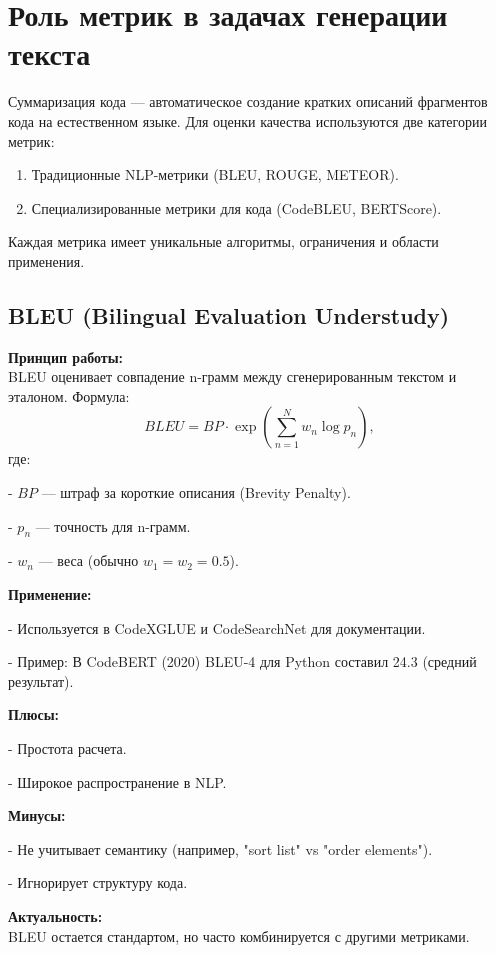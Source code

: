 \documentclass[14pt]{article}
\theoremstyle{definition}
\begin{document}
\newpage
\section{Роль метрик в задачах генерации текста}

Суммаризация кода — автоматическое создание кратких описаний фрагментов кода на естественном языке. Для оценки качества используются две категории метрик:

\begin{enumerate}
    \item Традиционные NLP-метрики (BLEU, ROUGE, METEOR).
    \item Специализированные метрики для кода (CodeBLEU, BERTScore).
\end{enumerate}

Каждая метрика имеет уникальные алгоритмы, ограничения и области применения.

\subsection{BLEU (Bilingual Evaluation Understudy)}

\textbf{Принцип работы:} \\
BLEU оценивает совпадение n-грамм между сгенерированным текстом и эталоном. Формула:
\[
BLEU = BP \cdot \exp\left(\sum_{n=1}^{N} w_n \log p_n\right),
\]
где:

    
- $BP$ — штраф за короткие описания (Brevity Penalty).
    
- $p_n$ — точность для n-грамм.
    
- $w_n$ — веса (обычно $w_1 = w_2 = 0.5$).


\textbf{Применение:}

    
- Используется в CodeXGLUE и CodeSearchNet для документации.
    
- Пример: В CodeBERT (2020) BLEU-4 для Python составил 24.3 (средний результат).


\textbf{Плюсы:}

    
- Простота расчета.
    
- Широкое распространение в NLP.


\textbf{Минусы:}

    
- Не учитывает семантику (например, "sort list" vs "order elements").
    
- Игнорирует структуру кода.


\textbf{Актуальность:} \\
BLEU остается стандартом, но часто комбинируется с другими метриками.
\end{document}
